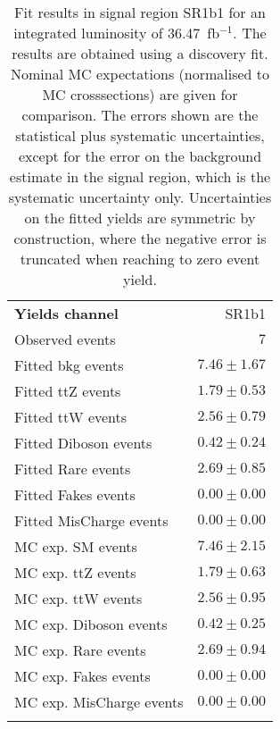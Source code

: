 

\begin{table}
\begin{center}
\setlength{\tabcolsep}{0.0pc}
{\small
\begin{tabular*}{\textwidth}{@{\extracolsep{\fill}}lr}
\noalign{\smallskip}\hline\noalign{\smallskip}
{\bfseries Yields channel}           & SR1b1              \\[-0.05cm]
\noalign{\smallskip}\hline\noalign{\smallskip}
Observed events          & $7$                    \\
\noalign{\smallskip}\hline\noalign{\smallskip}
Fitted bkg events         & $7.46 \pm 1.67$              \\
\noalign{\smallskip}\hline\noalign{\smallskip}
        Fitted ttZ events         & $1.79 \pm 0.53$              \\
        Fitted ttW events         & $2.56 \pm 0.79$              \\
        Fitted Diboson events         & $0.42 \pm 0.24$              \\
        Fitted Rare events         & $2.69 \pm 0.85$              \\
        Fitted Fakes events         & $0.00 \pm 0.00$              \\
        Fitted MisCharge events         & $0.00 \pm 0.00$              \\
 \noalign{\smallskip}\hline\noalign{\smallskip}
MC exp. SM events              & $7.46 \pm 2.15$              \\
\noalign{\smallskip}\hline\noalign{\smallskip}
        MC exp. ttZ events         & $1.79 \pm 0.63$              \\
        MC exp. ttW events         & $2.56 \pm 0.95$              \\
        MC exp. Diboson events         & $0.42 \pm 0.25$              \\
        MC exp. Rare events         & $2.69 \pm 0.94$              \\
        MC exp. Fakes events         & $0.00 \pm 0.00$              \\
        MC exp. MisCharge events         & $0.00 \pm 0.00$              \\
\noalign{\smallskip}\hline\noalign{\smallskip}
\end{tabular*}
}
\end{center}
\caption{Fit results in signal region SR1b1 for an integrated luminosity of 36.47~fb$^{-1}$.
The results are obtained using a discovery fit. Nominal MC expectations (normalised to MC crosssections) are given for comparison. 
The errors shown are the statistical plus systematic uncertainties, except for the error on the background estimate in the signal region, which is the systematic uncertainty only.
Uncertainties on the fitted yields are symmetric by construction, where the negative error is truncated when reaching to zero event yield.
}
\label{table.results.systematics.in.logL.fit..Yields.SR1b1}
\end{table}
\clearpage
%